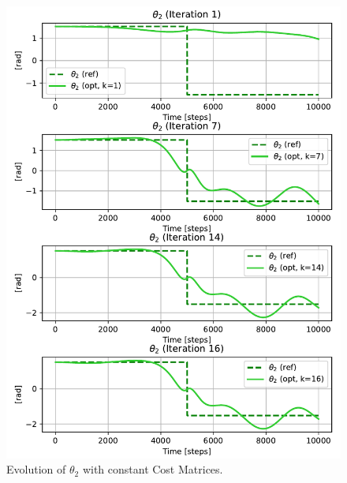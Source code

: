 \begin{figure}[htb]
    \centering
    \includegraphics[width=1\linewidth]{img/1-Task1/th2_const.pdf}
    \caption{Evolution of $\theta_2$ with constant Cost Matrices.}
    \label{fig:th2const}
\end{figure}

\clearpage

